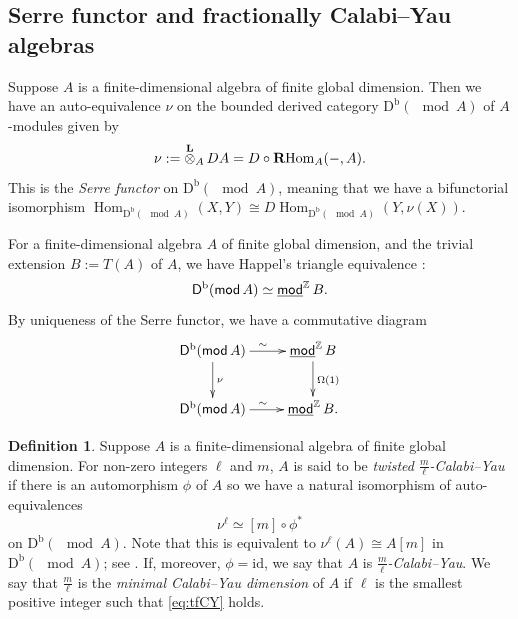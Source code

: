 \documentclass[a4paper,reqno,11pt]{amsart}
\theoremstyle{definition}
\newtheorem{definition}[theorem]{Definition}
\newcommand{\DDD}{\mathsf{D}}
\newcommand{\Z}{\mathbb{Z}}
\newcommand{\bo}{\operatorname{b}\nolimits}
\newcommand{\Hom}{\operatorname{Hom}\nolimits}
\newcommand{\RHom}{\mathbf{R}\strut\kern-.2em\operatorname{Hom}\nolimits}
\newcommand{\Lotimes}{\mathop{\stackrel{\mathbf{L}}{\otimes}}\nolimits}
\newcommand{\Db}{\mathrm{D}^{\mathrm{b}}}
\newcommand{\stmod}{\mathop{\underline{\mod}}\nolimits}
\newcommand{\new}[1]{{\blue #1}}
\numberwithin{equation}{section}
\begin{document}
\subsection{Serre functor and \new{fractionally Calabi--Yau algebras}}\label{subsec:CYdim}

Suppose $A$ is a finite-dimensional algebra of finite global dimension.
Then we have an auto-equivalence $\nu$ on the bounded derived category $\Db(\mod A)$ of $A$-modules given by
\[
\nu:= \Lotimes_ADA = D\circ \RHom_A(-,A).
\]
This is the \emph{Serre functor} on $\Db(\mod A)$, meaning that we have a bifunctorial isomorphism $\Hom_{\Db(\mod A)}(X,Y)\cong D\Hom_{\Db(\mod A)}(Y,\nu(X))$.


For a finite-dimensional algebra $A$ of finite global dimension, and the trivial extension $B:=T(A)$ of $A$, we have Happel's triangle equivalence \cite{Hap}:
\begin{equation}\label{happel}
\DDD^{\bo}(\mod A)\simeq\stmod^{\Z} B.
\end{equation}
By uniqueness of the Serre functor, we have a commutative diagram
\begin{equation}\label{serre}
\xymatrix{
\DDD^{\bo}(\mod A)\ar[r]^{\sim}\ar[d]^\nu&\stmod^{\Z}B\ar[d]^{\Omega(1)}\\
\DDD^{\bo}(\mod A)\ar[r]^{\sim}&\stmod^{\Z}B.}
\end{equation}



\begin{definition}
Suppose $A$ is a finite-dimensional algebra of finite global dimension.
For non-zero integers $\ell$ and $m$, $A$ is said to be \emph{twisted $\frac{m}{\ell}$-Calabi--Yau} if there is an automorphism $\phi$ of $A$ so 
we have a natural isomorphism of auto-equivalences
\begin{equation}\label{eq:tfCY}
\nu^\ell \simeq [m]\circ \phi^*
\end{equation}
on $\Db(\mod A)$.
Note that this is equivalent to $\nu^\ell(A)\cong A[m]$ in $\Db(\mod A)$; see \cite[Prop 4.3]{HerIya}.
If, moreover, $\phi=\mathrm{id}$, we say that $A$ is \emph{$\frac{m}{\ell}$-Calabi--Yau}.
We say that $\frac{m}{\ell}$ is the \emph{minimal Calabi--Yau dimension} of $A$ if $\ell$ is the smallest positive integer such that \eqref{eq:tfCY} holds.
\end{definition}

\end{document}
